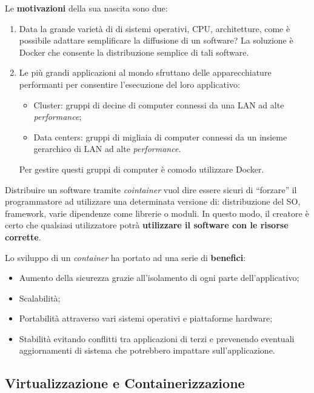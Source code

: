 \documentclass[a4paper]{article}
\newcommand{\dquotes}[1]{``#1''}
\begin{document}
	\noindent
	Le \textbf{motivazioni} della sua nascita sono due:
	\begin{enumerate}
		\item Data la grande varietà di di sistemi operativi, CPU, architetture, come è possibile adattare semplificare la diffusione di un software? La soluzione è Docker che consente la distribuzione semplice di tali software.
		
		\item Le più grandi applicazioni al mondo sfruttano delle apparecchiature performanti per consentire l'esecuzione del loro applicativo:
		\begin{itemize}
			\item Cluster: gruppi di decine di computer connessi da una LAN ad alte \emph{performance};
			\item Data centers: gruppi di migliaia di computer connessi da un insieme gerarchico di LAN ad alte \emph{performance}.
		\end{itemize}
		Per gestire questi gruppi di computer è comodo utilizzare Docker.
	\end{enumerate}
	Distribuire un software tramite \emph{cointainer} vuol dire essere sicuri di \dquotes{forzare} il programmatore ad utilizzare una determinata versione di: distribuzione del SO, framework, varie dipendenze come librerie o moduli. In questo modo, il creatore è certo che qualsiasi utilizzatore potrà \textbf{utilizzare il software con le risorse corrette}.\newline
	
	\noindent
	Lo sviluppo di un \emph{container} ha portato ad una serie di \textbf{benefici}:
	\begin{itemize}
		\item Aumento della sicurezza grazie all'isolamento di ogni parte dell'applicativo;
		\item Scalabilità;
		\item Portabilità attraverso vari sistemi operativi e piattaforme hardware;
		\item Stabilità evitando conflitti tra applicazioni di terzi e prevenendo eventuali aggiornamenti di sistema che potrebbero impattare sull'applicazione.
	\end{itemize}\newpage
	
	\subsection{Virtualizzazione e Containerizzazione}
	
\end{document}
